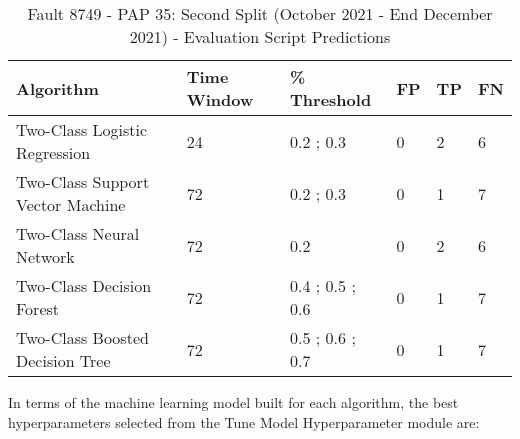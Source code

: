 \begin{table}[!ht]
    \centering
    \begin{tabular}{|l|l|l|l|l|l|}
    \hline
        Algorithm & Time Window & \% Threshold & FP & TP & FN \\ \hline
        Two-Class Logistic Regression & 24 & 0.2 ; 0.3 & 0 & 2 & 6 \\ \hline
        Two-Class Support Vector Machine & 72 & 0.2 ; 0.3 & 0 & 1 & 7 \\ \hline
        Two-Class Neural Network & 72 & 0.2 & 0 & 2 & 6 \\ \hline
        Two-Class Decision Forest & 72 & 0.4 ; 0.5 ; 0.6 & 0 & 1 & 7 \\ \hline
        Two-Class Boosted Decision Tree & 72 & 0.5 ; 0.6 ; 0.7 & 0 & 1 & 7 \\ \hline
    \end{tabular}
    \caption{Fault 8749 - PAP 35: Second Split (October 2021 - End December 2021) - Evaluation Script Predictions}
    \label{9112_SCA34_1st}
\end{table}

In terms of the machine learning model built for each algorithm, the best hyperparameters selected from the Tune Model Hyperparameter module are:

